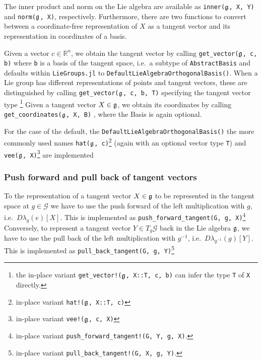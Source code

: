\documentclass{juliacon}
\begin{document}
The inner product and norm on the Lie algebra are available as \verb|inner(|$\frak g$\verb|, X, Y)| and \verb|norm(|$\frak g$\verb|, X)|, respectively.
Furthermore, there are two functions to convert between a coordinate-free representation of $X$ as a tangent vector and its representation in coordinates of a basis.

Given a vector $c \in \mathbb R^n$, we obtain the tangent vector by calling \verb|get_vector(|$\frak g$\verb|, c, b)| where \verb|b| is a basis of the tangent space, i.e.\ a subtype of \verb|AbstractBasis| and defaults within \verb|LieGroups.jl| to \verb|DefaultLieAlgebraOrthogonalBasis()|.
When a Lie group has different representations of points and tangent vectors, these are distinguished by calling \verb|get_vector(|$\frak g$\verb|, c, b, T)| specifying the tangent vector type
\footnote{the in-place variant \texttt{get\_vector!($\frak g$, X::T, c, b)} can infer the type \texttt{T} of \texttt{X} directly.}
Given a tangent vector $X \in \frak g$, we obtain its coordinates by calling \verb|get_coordinates(|$\frak g$\verb|, X, B)|%
, where the Basis is again optional.

For the case of the default, the \verb|DefaultLieAlgebraOrthogonalBasis()| the more commonly used names \verb|hat(|$\frak g$\verb|, c)|\footnote{in-place variant \texttt{hat!($\frak g$, X::T, c)}} (again with an optional vector type \verb|T|) and \verb|vee(|$\frak g$\verb|, X)|\footnote{in-place variant \texttt{vee!($\frak g$, c, X)}} are implemented

\subsubsection*{Push forward and pull back of tangent vectors}
To the representation of a tangent vector $X \in \frak g$ to be represented in the tangent space at $g \in \mathcal G$ we have to use the push forward of the left multiplication with $g$, i.e.\ $D\lambda_g(e)[X]$. This is implemented as \verb|push_forward_tangent(G, g, X)|\footnote{in-place variant \texttt{push\_forward\_tangent!(G, Y, g, X)}.}
Conversely, to represent a tangent vector $Y \in T_g\mathcal G$ back in the Lie algebra $\frak g$, we have to use the pull back of the left multiplication with $g^{-1}$, i.e.\ $D\lambda_{g^{-1}}(g)[Y]$. This is implemented as \verb|pull_back_tangent(G, g, Y)|\footnote{in-place variant \texttt{pull\_back\_tangent!(G, X, g, Y)}.}
\end{document}
